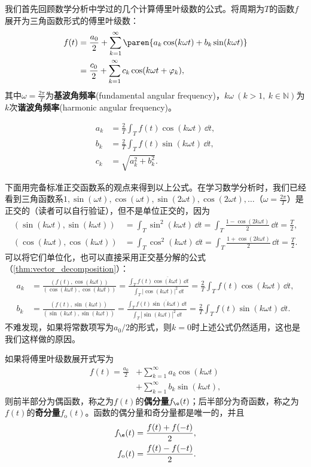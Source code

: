 我们首先回顾数学分析中学过的几个计算傅里叶级数的公式。将周期为$T$的函数$f$展开为三角函数形式的傅里叶级数：
\begin{align}
    f(t) & =\frac{a_0}{2}+\sum_{k = 1}^{\infty}\paren{a_k \cos(k\omega t)+b_k\sin(k\omega t)} \nonumber\\
         & =\frac{c_0}{2}+\sum_{k = 1}^{\infty} c_k\cos(k\omega t+\varphi _k),
\end{align}
其中$\displaystyle \omega =\frac{2\pi}{T}$为\textbf{基波角频率}(fundamental angular frequency)，$k\omega\ (k>1,\ k\in \mathbb{N})$为$k$次\textbf{谐波角频率}(harmonic angular frequency)。
\begin{theorem}[三角函数形式的傅里叶系数公式]
    \begin{align}
        a_k&=\frac{2}{T}\int_T f(t)\cos(k\omega t)\,\dd t,\\
        b_k&=\frac{2}{T}\int_T f(t)\sin(k\omega t)\,\dd t,\\
        c_k&=\sqrt{a_k^2+b_k^2}.
    \end{align}
\end{theorem}
下面用完备标准正交函数系的观点来得到以上公式。在学习数学分析时，我们已经看到三角函数系$1,\sin(\omega t),\cos(\omega t),\sin(2\omega t),\cos(2\omega t),\dots$（$\displaystyle \omega =\frac{2\pi}{T}$）是正交的（读者可以自行验证），但不是单位正交的，因为
\begin{align}
    (\sin(k\omega t),\sin(k\omega t))&=\int_{T}\sin^2(k\omega t)\,\dd t=\int_{T}\frac{1-\cos(2k\omega t)}{2}\,\dd t=\frac{T}{2},\\
    (\cos(k\omega t),\cos(k\omega t))&=\int_{T}\cos^2(k\omega t)\,\dd t=\int_{T}\frac{1+\cos(2k\omega t)}{2}\,\dd t=\frac{T}{2}.
\end{align}
可以将它们单位化，也可以直接采用正交基分解的公式（\cref{thm:vector_decomposition}）：
\begin{align}
    a_k&=\frac{(f(t),\cos(k\omega t))}{(\cos(k\omega t),\cos(k\omega t))}=\frac{\int_{T}f(t)\overline{\cos(k\omega t)}\,\dd t}{\int_{T}|\cos(k\omega t)|^2\,\dd t}
        =\frac{2}{T}\int_{T}f(t)\cos(k\omega t)\,\dd t,\\
    b_k&=\frac{(f(t),\sin(k\omega t))}{(\sin(k\omega t),\sin(k\omega t))}=\frac{\int_{T}f(t)\overline{\sin(k\omega t)}\,\dd t}{\int_{T}|\sin(k\omega t)|^2\,\dd t}
        =\frac{2}{T}\int_{T}f(t)\sin(k\omega t)\,\dd t.
\end{align}
不难发现，如果将常数项写为$a_0/2$的形式，则$k=0$时上述公式仍然适用，这也是我们这样做的原因。

如果将傅里叶级数展开式写为
\begin{align}
    f(t) = \frac{a_0}{2}&+\sum_{k = 1}^{\infty} a_k \cos(k\omega t) \nonumber\\
           &+\sum_{k = 1}^{\infty} b_k \sin(k\omega t),
\end{align}
则前半部分为偶函数，称之为$f(t)$的\textbf{偶分量}$f_{\e}(t)$；后半部分为奇函数，称之为$f(t)$的\textbf{奇分量}$f_{\mathrm{o}}(t)$。函数的偶分量和奇分量都是唯一的，并且
\begin{align}
    f_{\e}(t)&=\frac{f(t)+f(-t)}{2}, \\
    f_{\mathrm{o}}(t)&=\frac{f(t)-f(-t)}{2}.
\end{align}

